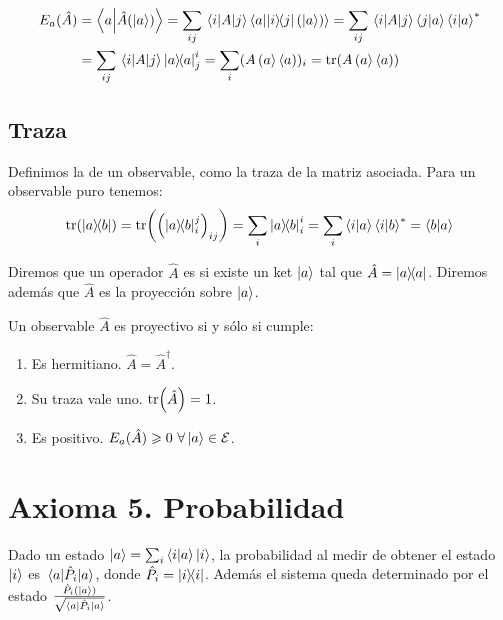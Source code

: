 \begin{equation}
	\label{eq:valor-esperado}
	\begin{align}
		E_a(\hat{A}) & =\braket{a}{\hat{A}(\ket{a})}=\sum_{ij}\matrixelement{i}{A}{j}\braket{a}{\ketbra{i}{j}(\ket{a})}=\sum_{ij}\matrixelement{i}{A}{j}\braket{j}{a}\braket{i}{a}^* \\
		& =\sum_{ij}\matrixelement{i}{A}{j}\ketbramelement{a}{a}{j}{i}=\sum_{i}(A\ketbram{a}{a})_i=\tr(A\ketbram{a}{a})
	\end{align}
\end{equation}

\subsection{Traza}\label{subsec:traza}
Definimos la  de un observable, como la traza de la matriz asociada.
Para un observable puro tenemos:
\begin{equation}
	\label{eq:traza-observable-puro}
	\tr(\ketbra{a}{b})=\tr(\left(\ketbra{a}{b}_{i}^{j}\right)_{ij})=\sum_i\ketbra{a}{b}_{i}^{i}=\sum_i\braket{i}{a}\braket{i}{b}^*=\braket{b}{a}
\end{equation}

Diremos que un operador $\hat{A}$ es  si existe un ket $\ket{a}$ tal que $\hat{A}=\ketbra{a}{a}$.
Diremos además que $\hat{A}$ es la proyección sobre $\ket{a}$.

\begin{proposition}
	Un observable $\hat{A}$ es proyectivo si y sólo si cumple:
	\begin{enumerate}
		\item Es hermitiano. $\hat{A}=\hat{A}^\dagger$.
		\item Su traza vale uno. $\tr(\hat{A})=1$.
		\item Es positivo. $E_a(\hat{A})\geqslant 0\ \forall\ket{a}\in\E$.
	\end{enumerate}
\end{proposition}

\section{Axioma 5. Probabilidad}\label{sec:axioma-5.-probabilidad}
\begin{definition}[Axioma 5]
	Dado un estado $\ket{a}=\sum_i \braket{i}{a}\ket{i}$, la probabilidad al medir de obtener el estado $\ket{i}$ es $\ev{\hat{P}_i}{a}$, donde $\hat{P}_i = \ketbra{i}{i}$.
	Además el sistema queda determinado por el estado $\frac{\hat{P}_i(\ket{a})}{\sqrt {\ev{\hat{P}_i}{a}}}$.
\end{definition}

